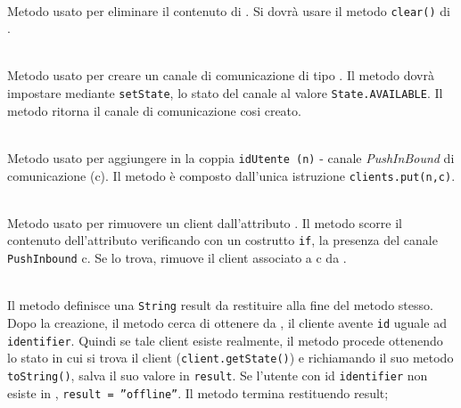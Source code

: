 \begin{description}
	\item{}\\
	Metodo usato per eliminare il contenuto di . Si dovrà usare il metodo \texttt{clear()} di .
	
	\item{}\\
	Metodo usato per creare un canale di comunicazione di tipo . Il metodo dovrà impostare mediante \texttt{setState}, lo stato del canale al valore \verb|State.AVAILABLE|. Il metodo ritorna il canale di comunicazione cosi creato.
	
	\item{}\\
	Metodo usato per aggiungere in  la coppia \texttt{idUtente (n)} - canale \textit{PushInBound} di comunicazione (c). Il metodo è composto dall'unica istruzione \verb|clients.put(n,c)|.
	
	\item{}\\
	Metodo usato per rimuovere un client dall'attributo . Il metodo scorre il contenuto dell'attributo verificando con un costrutto \texttt{if}, la presenza del canale \texttt{PushInbound} c. Se lo trova, rimuove il client associato a c da .
	
	\item{}\\
	Il metodo definisce una \texttt{String} result da restituire alla fine del metodo stesso. Dopo la creazione, il metodo cerca di ottenere da , il cliente avente \texttt{id} uguale ad \texttt{identifier}. Quindi se tale client esiste realmente, il metodo procede ottenendo lo stato in cui si trova il client (\texttt{client.getState()}) e richiamando il suo metodo \texttt{toString()}, salva il suo valore in \texttt{result}. Se l'utente con id \texttt{identifier} non esiste in , \texttt{result = ''offline''}. Il metodo termina restituendo result;
	

\end{description}
